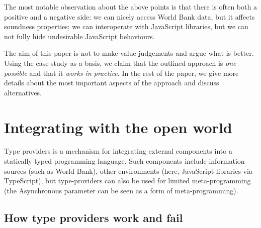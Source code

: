 \documentclass[submission,copyright,creativecommons]{eptcs}
\newcommand{\ident}[1]{\textnormal{\sffamily #1}}
\begin{document}
\noindent
The most notable observation about the above points is that there is often both a positive and
a negative side: we can nicely access World Bank data, but it affects soundness properties;
we can interoperate with JavaScript libraries, but we can not fully hide undesirable JavaScript 
behaviours.

The aim of this paper is not to make value judgements and argue what is better. Using the case
study as a basis, we claim that the outlined approach is \emph{one possible} and that it
\emph{works in practice}. In the rest of the paper, we give more details about the most important 
aspects of the approach and discuss alternatives.

                                                  

%


\section{Integrating with the open world}
\label{sec:tp}

Type providers \cite{fsharp-typeprov} is a mechanism for integrating external components into a 
statically typed programming language. Such components include information sources (such as World
Bank), other environments (here, JavaScript libraries via TypeScript), but type-providers can 
also be used for limited meta-programming (the \ident{Asynchronous} parameter can be seen as
a form of meta-programming).


\subsection{How type providers work and fail}
\label{sec:tp-def}
\end{document}
